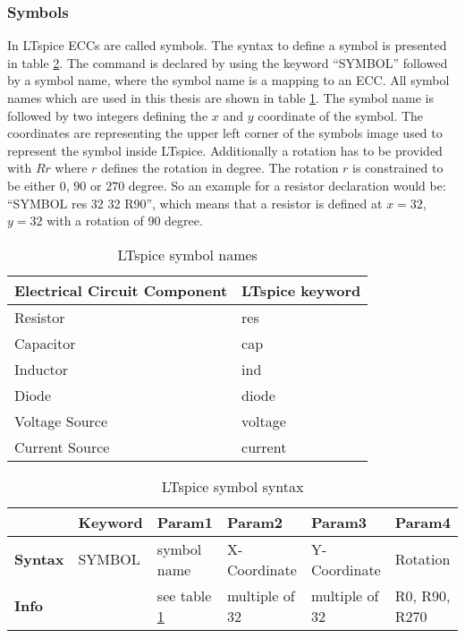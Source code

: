 \subsubsection{Symbols}

In LTspice \acp{ECC} are called symbols.
The syntax to define a symbol is presented in table \ref{tab:ltsymbol_syntax}.
The command is declared by using the keyword ``SYMBOL'' followed by a symbol name, where the symbol name is a mapping to an \ac{ECC}.
All symbol names which are used in this thesis are shown in table \ref{tab:ltsymbol_mapping}.
The symbol name is followed by two integers defining the $x$ and $y$ coordinate of the symbol.
The coordinates are representing the upper left corner of the symbols image used to represent the symbol inside LTspice.
Additionally a rotation has to be provided with $Rr$ where $r$ defines the rotation in degree.
The rotation $r$ is constrained to be either $0$, $90$ or $270$ degree.
So an example for a resistor declaration would be: ``SYMBOL res 32 32 R90'', which means that a resistor is defined at $x = 32$, $y = 32$ with a rotation of $90$ degree.

\begin{table}[H]
\begin{center}

\begin{tabular}{l|l}
    \textbf{Electrical Circuit Component} & \textbf{LTspice keyword}\\
    \hline
    Resistor & res\\
    Capacitor & cap\\
    Inductor & ind\\
    Diode & diode\\
    Voltage Source & voltage\\
    Current Source & current
\end{tabular}
\caption{LTspice symbol names}
\label{tab:ltsymbol_mapping}

\end{center}
\end{table}

\begin{table}[H]
\begin{center}

\begin{tabular}{l|l|l|l|l|l}
    & \textbf{Keyword} & \textbf{Param1} & \textbf{Param2} & \textbf{Param3} & \textbf{Param4}\\
    \hline
    \textbf{Syntax} & SYMBOL & symbol name & X-Coordinate & Y-Coordinate & Rotation\\
    \textbf{Info} & & see table \ref{tab:ltsymbol_mapping} & multiple of 32 & multiple of 32 & R0, R90, R270
\end{tabular}
\caption{LTspice symbol syntax}
\label{tab:ltsymbol_syntax}

\end{center}
\end{table}

